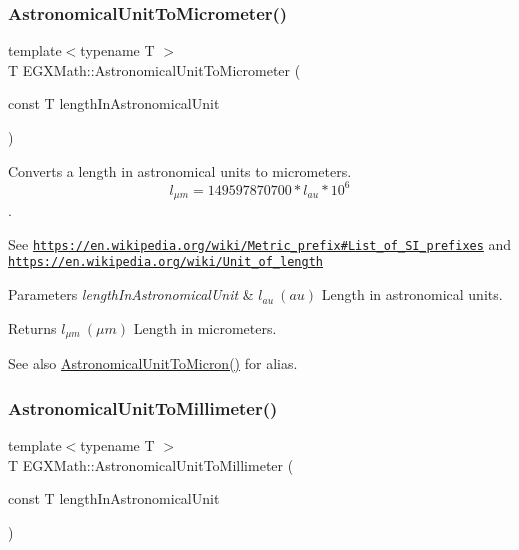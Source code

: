 \subsubsection{\texorpdfstring{Astronomical\+Unit\+To\+Micrometer()}{AstronomicalUnitToMicrometer()}}
{\footnotesize\ttfamily template$<$typename T $>$ \\
T E\+G\+X\+Math\+::\+Astronomical\+Unit\+To\+Micrometer (\begin{DoxyParamCaption}\item[{const T}]{length\+In\+Astronomical\+Unit }\end{DoxyParamCaption})}



Converts a length in astronomical units to micrometers. \[ l_{\mu m}=149597870700 * l_{au} * 10^{6} \]. 

See \href{https://en.wikipedia.org/wiki/Metric_prefix#List_of_SI_prefixes}{\tt https\+://en.\+wikipedia.\+org/wiki/\+Metric\+\_\+prefix\#\+List\+\_\+of\+\_\+\+S\+I\+\_\+prefixes} and \href{https://en.wikipedia.org/wiki/Unit_of_length}{\tt https\+://en.\+wikipedia.\+org/wiki/\+Unit\+\_\+of\+\_\+length} 
\begin{DoxyParams}{Parameters}
{\em length\+In\+Astronomical\+Unit} & $ l_{au}\ (au)$ Length in astronomical units. \\
\hline
\end{DoxyParams}
\begin{DoxyReturn}{Returns}
$ l_{\mu m}\ (\mu m)$ Length in micrometers. 
\end{DoxyReturn}
\begin{DoxySeeAlso}{See also}
\mbox{\hyperlink{group___e_g_x_math-_conversions-_length_conversions-_astronomical-_astronomical_unit-_non-_s_i_ga9fd03b0356095288ca7476121e45042d}{Astronomical\+Unit\+To\+Micron()}} for alias. 
\end{DoxySeeAlso}
\mbox{\label{group___e_g_x_math-_conversions-_length_conversions-_astronomical-_astronomical_unit-_s_i_ga8cb9e3414859d13ed8257893fff0f8b9}} 
\subsubsection{\texorpdfstring{Astronomical\+Unit\+To\+Millimeter()}{AstronomicalUnitToMillimeter()}}
{\footnotesize\ttfamily template$<$typename T $>$ \\
T E\+G\+X\+Math\+::\+Astronomical\+Unit\+To\+Millimeter (\begin{DoxyParamCaption}\item[{const T}]{length\+In\+Astronomical\+Unit }\end{DoxyParamCaption})}



